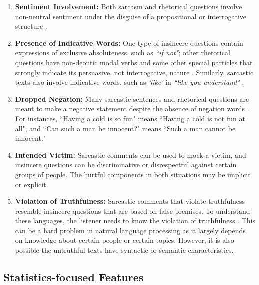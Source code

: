 \documentclass[12pt]{diazessay} %
\begin{document}
\begin{enumerate}
	\item \textbf{Sentiment Involvement:} Both sarcasm and rhetorical questions involve non-neutral sentiment under the disguise of a propositional or interrogative structure \citep{joshi2017, schmidt1977}. 
	\item \textbf{Presence of Indicative Words:} One type of insincere questions contain expressions of exclusive absoluteness, such as \textit{``if not"}; other rhetorical questions have non-deontic modal verbs and some other special particles that strongly indicate its persuasive, not interrogative, nature \citep{schmidt1977}. Similarly, sarcastic texts also involve indicative words, such as \textit{`like'} in \textit{``like you understand"} \citep{joshi2017}. 
	\item \textbf{Dropped Negation:} Many sarcastic sentences and rhetorical questions are meant to make a negative statement despite the absence of negation words  \citep{joshi2017, schmidt1977}. For instances, ``Having a cold is so fun" means ``Having a cold is not fun at all", and ``Can such a man be innocent?" means ``Such a man cannot be innocent."
	\item \textbf{Intended Victim:} Sarcastic comments can be used to mock a victim, and insincere questions can be discriminative or disrespectful against certain groups of people. The hurtful components in both situations may be implicit or explicit. 
	\item \textbf{Violation of Truthfulness:} Sarcastic comments that violate truthfulness resemble insincere questions that are based on false premises. To understand these languages, the listener needs to know the violation of truthfulness \citep{joshi2017}. This can be a hard problem in natural language processing as it largely depends on knowledge about certain people or certain topics. However, it is also possible the untruthful texts have syntactic or semantic characteristics.  
\end{enumerate}

\subsection{Statistics-focused Features}
\end{document}
